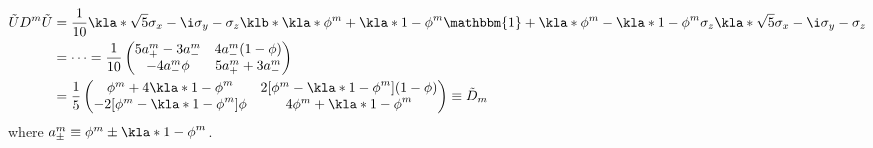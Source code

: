 \documentclass[english, parskip=full]{scrartcl}
\begin{document}
\begin{align}
\tilde{U}D^m\tilde{U} &= \frac{1}{10} \kla*{\sqrt{5} \sigma_x - \i\sigma_y - \sigma_z} \klb*{\kla*{\phi^m + \kla*{1-\phi}^m} \mathbbm{1} + \kla*{\phi^m - \kla*{1-\phi}^m}\sigma_z} \kla*{\sqrt{5} \sigma_x - \i\sigma_y - \sigma_z}\\
&= \dots = \frac{1}{10}\begin{pmatrix}
5a_+^m - 3a_-^m & 4a_-^m(1 - \phi) \\ -4a_-^m\phi & 5a_+^m + 3a_-^m
\end{pmatrix} \\
&= \frac{1}{5}\begin{pmatrix}
\phi^m + 4\kla*{1-\phi}^m & 2[\phi^m - \kla*{1-\phi}^m](1 - \phi) \\ -2[\phi^m - \kla*{1-\phi}^m]\phi & 4\phi^m + \kla*{1-\phi}^m
\end{pmatrix} \equiv \tilde{D}_m
\end{align}
where $a_\pm^m \equiv \phi^m \pm \kla*{1-\phi}^m$.
\end{document}
